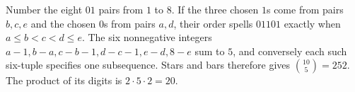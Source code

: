 Number the eight $01$ pairs from $1$ to $8$. If the three chosen $1$s come from pairs $b,c,e$ and the chosen $0$s from pairs $a,d$, their order spells $01101$ exactly when $a\le b<c<d\le e$. The six nonnegative integers $a-1,b-a,c-b-1,d-c-1,e-d,8-e$ sum to $5$, and conversely each such six-tuple specifies one subsequence. Stars and bars therefore gives $\binom{10}{5}=252$. The product of its digits is $2\cdot5\cdot2=\boxed{20}$.
